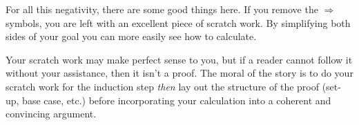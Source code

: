 For all this negativity, there are some good things here. If you remove the $\Longrightarrow$ symbols, you are left with an excellent piece of scratch work. By simplifying both sides of your goal you can more easily see how to calculate. %

Your scratch work may make perfect sense to you, but if a reader cannot follow it without your assistance, then it isn't a proof. The moral of the story is to do your scratch work for the induction step \emph{then} lay out the structure of the proof (set-up, base case, etc.) before incorporating your calculation into a coherent and convincing argument.
% 
% 


